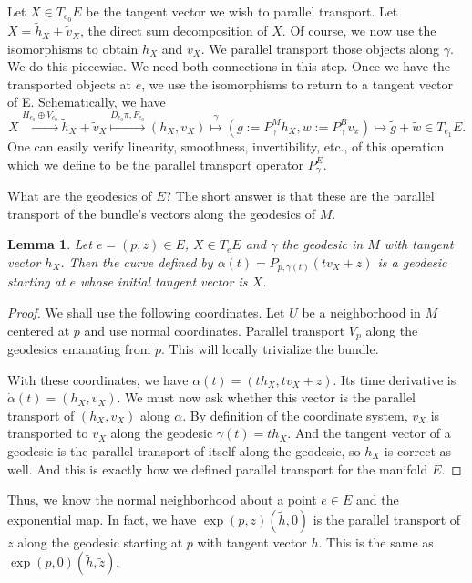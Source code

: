 \documentclass[11pt]{article}
\newtheorem{lemma}{Lemma}
\theoremstyle{remark}
\begin{document}
Let $X
\in T_{e_0} E$ be the tangent vector we wish to parallel
transport. Let $X = \tilde{h}_X +\tilde{v}_X$, 
the direct sum decomposition of $X$. 
Of course, we now use the isomorphisms to obtain $h_X$ and $v_X$. We
parallel transport those objects along $\gamma$. We 
do this piecewise. We need both connections in this step. Once we have
the transported objects at $e$, we use the isomorphisms to return to a
tangent vector of E. Schematically, we have
\[
X \overset{H_{e_0} \oplus V_{e_0}}{\longmapsto} \tilde{h}_X + \tilde{v}_X 
\overset{D_{e_0} \pi, F_{e_0}}{\longmapsto} (h_X, v_X)
\overset{\gamma}{\mapsto} (g \ensuremath{:=} P_{\gamma}^M h_X, w \ensuremath{:=} P_{\gamma}^B v_x)
{\mapsto} \tilde{g}+
\tilde{w} \in T_{e_1} E  .
\]
One can easily verify linearity, smoothness, invertibility, etc., of
this operation which we define to be the parallel transport operator 
$P_{\gamma}^E$. 

What are the geodesics of $E$? The short answer is that these are the
parallel transport of the bundle's vectors along the geodesics of $M$. 

\begin{lemma}  Let $e = (p,z) \in E$, 
 $X \in T_eE$ and $\gamma$ the geodesic in $M$ with tangent vector
$h_X$.
 Then the
curve defined by $\alpha(t) = \ensuremath{P_{{p},{\gamma(t)}}({tv_X + z})}$ is a
geodesic starting at $e$ whose initial tangent vector is $X$.
\end{lemma}

\begin{proof} 
We shall use the following coordinates. Let $U$ be a 
neighborhood in $M$ centered at $p$ and use normal coordinates. 
Parallel transport  $V_p$ along the geodesics emanating from $p$. This
will locally trivialize the bundle.


With these coordinates, we have $\alpha(t) = (th_X, tv_X +z)$. 
Its time derivative is
$\dot{\alpha}(t) = (h_X, v_X)$. We must now ask whether this vector is
the parallel transport of $(h_X, v_X)$ along $\alpha$. By definition of
the coordinate system, $v_X$ is transported to $v_X$ 
along the geodesic $\gamma(t) = th_X$.  
And the tangent vector of a geodesic is the parallel transport of
itself along the geodesic, so $h_X$ is correct as well. And this is
exactly how we defined parallel transport for the manifold $E$. 
\end{proof}


Thus, we  know the normal neighborhood about a point $e \in
E$ and the exponential map. In fact, we have $\exp{(p,z)}{(\tilde{h},0)}$ is
the parallel transport of $z$ along the geodesic starting at $p$ with
tangent vector $h$. This is the same as $\exp{(p,0)}{(\tilde{h},
\tilde{z})}$. 
\end{document}
